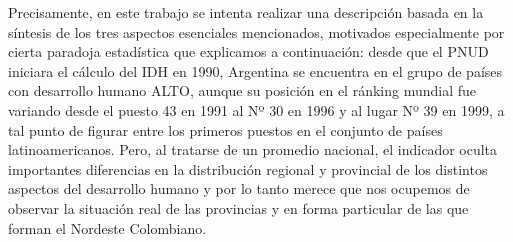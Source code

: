 Precisamente, en este trabajo se intenta realizar una descripción basada en la síntesis de los tres aspectos esenciales mencionados, motivados especialmente por cierta paradoja estadística que explicamos a continuación: desde que el PNUD iniciara el cálculo del IDH en 1990, Argentina se encuentra en el grupo de países con desarrollo humano ALTO, aunque su posición en el ránking mundial fue variando desde el puesto 43 en 1991 al Nº 30 en 1996 y al lugar Nº 39 en 1999, a tal punto de figurar entre los primeros puestos en el conjunto de países latinoamericanos. Pero, al tratarse de un promedio nacional, el indicador oculta importantes diferencias en la distribución regional y provincial de los distintos aspectos del desarrollo humano y por lo tanto merece que nos ocupemos de observar la situación real de las provincias y en forma particular de las que forman el Nordeste Colombiano.

\endinput
